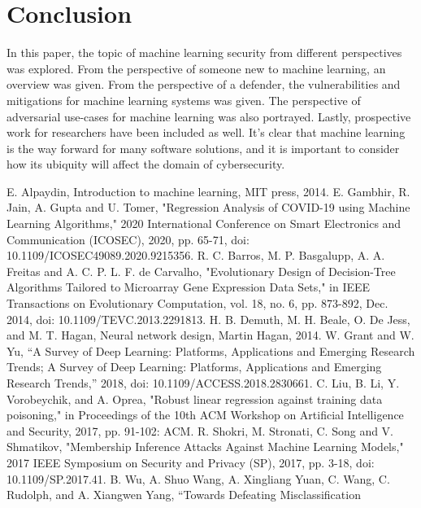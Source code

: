\documentclass[11pt,conference]{IEEEtran}
\begin{document}
\section{Conclusion}
In this paper, the topic of machine learning security from different
perspectives was explored. From the perspective of someone new to machine
learning, an overview was given. From the perspective of a defender, the
vulnerabilities and mitigations for machine learning systems was given. The
perspective of adversarial use-cases for machine learning was also portrayed. Lastly,
prospective work for researchers have been included as well. It's clear that
machine learning is the way forward for many software solutions, and it is
important to consider how its ubiquity will affect the domain of cybersecurity. 


\begin{thebibliography}{00}
     E. Alpaydin, Introduction to machine learning, MIT press,
        2014.
     E. Gambhir, R. Jain, A. Gupta and U. Tomer, "Regression
        Analysis of COVID-19 using Machine Learning Algorithms," 2020
        International Conference on Smart Electronics and Communication
        (ICOSEC), 2020, pp. 65-71, doi: 10.1109/ICOSEC49089.2020.9215356.
     R. C. Barros, M. P. Basgalupp, A. A. Freitas and A. C. P. L.
        F. de Carvalho, "Evolutionary Design of Decision-Tree Algorithms
        Tailored to Microarray Gene Expression Data Sets," in IEEE Transactions
        on Evolutionary Computation, vol. 18, no. 6, pp. 873-892, Dec. 2014,
        doi: 10.1109/TEVC.2013.2291813.
     H. B. Demuth, M. H. Beale, O. De Jess, and M. T.
        Hagan, Neural network design, Martin Hagan, 2014.
     W. Grant and W. Yu, “A Survey of Deep Learning: Platforms,
        Applications and Emerging Research Trends; A Survey of Deep Learning:
        Platforms, Applications and Emerging Research Trends,” 2018, doi:
        10.1109/ACCESS.2018.2830661.
     C. Liu, B. Li, Y. Vorobeychik, and A. Oprea, "Robust linear
        regression against  training  data  poisoning,"  in Proceedings  of
        the  10th  ACM Workshop  on  Artificial  Intelligence  and  Security,
        2017,  pp.  91-102: ACM.
     R. Shokri, M. Stronati, C. Song and V. Shmatikov, "Membership
        Inference Attacks Against Machine Learning Models," 2017 IEEE Symposium
        on Security and Privacy (SP), 2017, pp. 3-18, doi: 10.1109/SP.2017.41.
     B. Wu, A. Shuo Wang, A. Xingliang Yuan, C. Wang, C.
        Rudolph, and A. Xiangwen Yang, “Towards Defeating Misclassification

\end{thebibliography}
\end{document}

